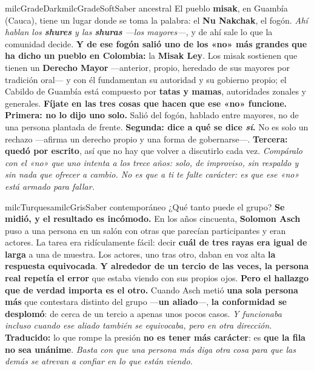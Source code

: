 \documentclass[11pt,letterpaper]{article}
\begin{document}
\begin{softbox}{milcGradeDark}{milcGradeSoft}{Saber ancestral}
El pueblo \textbf{misak}, en Guambía (Cauca), tiene un lugar donde se toma la palabra: el \textbf{Nu Nakchak}, el fogón. \emph{Ahí hablan los \textbf{shures} y las \textbf{shuras} ---los mayores---,} y de ahí sale lo que la comunidad decide. \textbf{Y de ese fogón salió uno de los «no» más grandes que ha dicho un pueblo en Colombia:} la \textbf{Misak Ley}. Los misak sostienen que tienen un \textbf{Derecho Mayor} ---anterior, propio, heredado de sus mayores por tradición oral--- y con él fundamentan su autoridad y su gobierno propio; el Cabildo de Guambía está compuesto por \textbf{tatas y mamas}, autoridades zonales y generales. \textbf{Fíjate en las tres cosas que hacen que ese «no» funcione.} \textbf{Primera: no lo dijo uno solo.} Salió del fogón, hablado entre mayores, no de una persona plantada de frente. \textbf{Segunda: dice a qué se dice \emph{sí}.} No es solo un rechazo ---afirma un derecho propio y una forma de gobernarse---. \textbf{Tercera: quedó por escrito}, así que no hay que volver a discutirlo cada vez. \emph{Compáralo con el «no» que uno intenta a los trece años: solo, de improviso, sin respaldo y sin nada que ofrecer a cambio. No es que a ti te falte carácter: es que ese «no» está armado para fallar.}
\end{softbox}

\begin{softbox}{milcTurquesa}{milcGris}{Saber contemporáneo}
¿Qué tanto puede el grupo? \textbf{Se midió, y el resultado es incómodo.} En los años cincuenta, \textbf{Solomon Asch} puso a una persona en un salón con otras que parecían participantes y eran actores. La tarea era ridículamente fácil: decir \textbf{cuál de tres rayas era igual de larga} a una de muestra. Los actores, uno tras otro, daban en voz alta \textbf{la respuesta equivocada}. \textbf{Y alrededor de un tercio de las veces, la persona real repetía el error} que estaba viendo con sus propios ojos. \textbf{Pero el hallazgo que de verdad importa es el otro.} Cuando Asch metió \textbf{una sola persona más} que contestara distinto del grupo ---\textbf{un aliado}---, \textbf{la conformidad se desplomó}: de cerca de un tercio a apenas unos pocos casos. \emph{Y funcionaba incluso cuando ese aliado también se equivocaba, pero en otra dirección.} \textbf{Traducido:} lo que rompe la presión \textbf{no es tener más carácter}: es \textbf{que la fila no sea unánime}. \emph{Basta con que una persona más diga otra cosa para que las demás se atrevan a confiar en lo que están viendo.}
\end{softbox}
\end{document}
